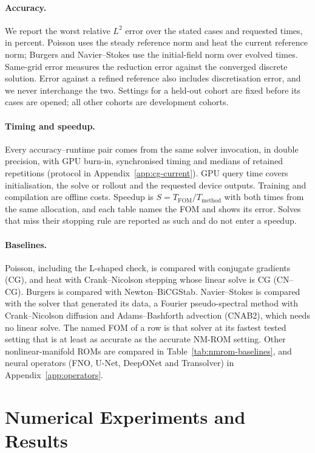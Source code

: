 \documentclass{article}
\begin{document}
\paragraph{Accuracy.}
We report the worst relative $L^2$ error over the stated cases and
requested times, in percent. Poisson uses the steady reference norm and
heat the current reference norm; Burgers and Navier--Stokes use the
initial-field norm over evolved times. Same-grid error measures the
reduction error against the converged discrete solution. Error against a
refined reference also includes discretisation error, and we never
interchange the two. Settings for a held-out cohort are fixed before its
cases are opened; all other cohorts are development cohorts.

\paragraph{Timing and speedup.}
Every accuracy--runtime pair comes from the same solver invocation, in
double precision, with GPU burn-in, synchronised timing and medians of
retained repetitions (protocol in Appendix~\ref{app:cg-current}). GPU
query time covers initialisation, the solve or rollout and the requested
device outputs. Training and compilation are offline costs. Speedup is
$S=T_{\mathrm{FOM}}/T_{\mathrm{method}}$ with both times from the same
allocation, and each table names the FOM and shows its error. Solves that
miss their stopping rule are reported as such and do not enter a
speedup.

\paragraph{Baselines.}
Poisson, including the L-shaped check, is compared with conjugate
gradients (CG), and heat with Crank--Nicolson stepping whose linear solve
is CG (CN--CG). Burgers is compared with Newton--BiCGStab. Navier--Stokes
is compared with the solver that generated its data, a Fourier
pseudo-spectral method with Crank--Nicolson diffusion and Adams--Bashforth
advection (CNAB2), which needs no linear solve. The named FOM of a row is
that solver at its fastest tested setting that is at least as accurate as
the accurate NM-ROM setting. Other nonlinear-manifold ROMs are compared in
Table~\ref{tab:nmrom-baselines}, and neural operators (FNO, U-Net,
DeepONet and Transolver) in Appendix~\ref{app:operators}.

\section{Numerical Experiments and Results}\label{sec:results}
\end{document}
